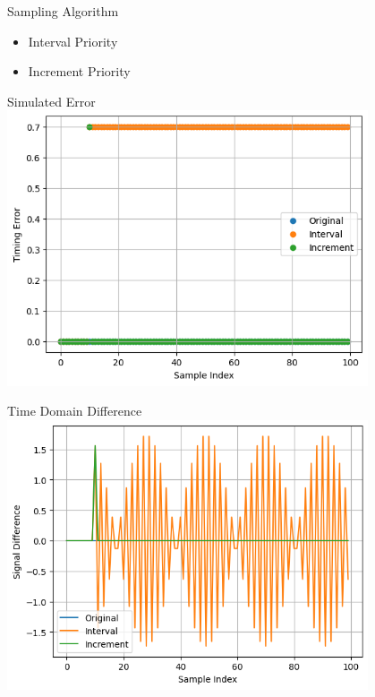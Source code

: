 \begin{frame}{Sampling Algorithm}
    \begin{itemize}
        \item Interval Priority
        \item Increment Priority
    \end{itemize}
\end{frame}
\begin{frame}{Simulated Error}
    \centering
    \includegraphics[height=0.8\textheight,width=0.8\textwidth,keepaspectratio]{images/sf_error.png}
\end{frame}
\begin{frame}{Time Domain Difference}
    \centering
    \includegraphics[height=0.8\textheight,width=0.8\textwidth,keepaspectratio]{images/sf_t_diff.png}
\end{frame}
